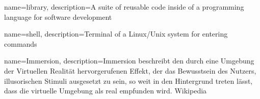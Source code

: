 {
    name={library},
    description={A suite of reusable code inside of a programming language for software development}
}


{
    name={shell},
    description={Terminal of a Linux/Unix system for entering commands}
}

{
    name={Immersion},
    description={Immersion beschreibt den durch eine Umgebung der Virtuellen Realität hervorgerufenen Effekt, der das Bewusstsein des Nutzers, illusorischen Stimuli ausgesetzt zu sein, so weit in den Hintergrund treten lässt, dass die virtuelle Umgebung als real empfunden wird. Wikipedia}
}


\glsaddall
